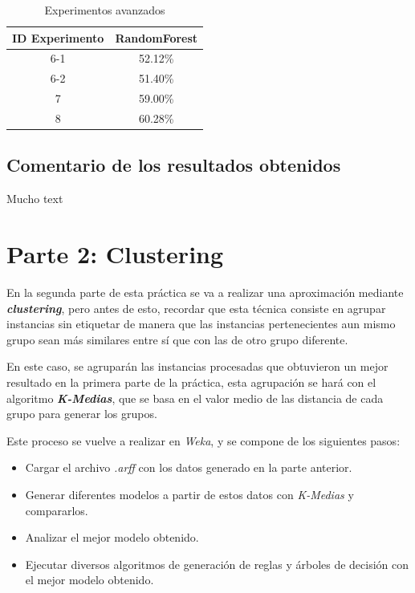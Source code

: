 \documentclass[12pt,a4paper, xcolor=table]{article}
\begin{document}
        \begin{table}[h]
            \centering
            \begin{tabular}{|c|c|}
            \hline
            \rowcolor[HTML]{DAE8FC}
            \textbf{ID Experimento} & \textbf{RandomForest} \\ \hline
            6-1                     & 52.12\%               \\ \hline
            6-2                     & 51.40\%               \\ \hline
            7                       & 59.00\%               \\ \hline
            8                       & 60.28\%               \\ \hline
            \end{tabular}
            \caption{Experimentos avanzados}
                \label{fig:graf_exp1}
        \end{table}

    \subsection{Comentario de los resultados obtenidos}
    Mucho text

\section{Parte 2: Clustering}

En la segunda parte de esta práctica se va a realizar una aproximación mediante \textbf{\textit{clustering}}, pero antes de esto, recordar que esta técnica consiste en agrupar instancias sin etiquetar de manera que las instancias pertenecientes aun mismo grupo sean más similares entre sí que con las de otro grupo diferente. 

\vspace{2mm}

En este caso, se agruparán las instancias procesadas que obtuvieron un mejor resultado en la primera parte de la práctica, esta agrupación se hará con el algoritmo \textbf{\textit{K-Medias}}, que se basa en el valor medio de las distancia de cada grupo para generar los grupos. 

\vspace{1mm}

Este proceso se vuelve a realizar en \textit{Weka}, y se compone de los siguientes pasos:

\begin{itemize}
    \item Cargar el archivo \textit{.arff} con los datos generado en la parte anterior.
    \item Generar diferentes modelos a partir de estos datos con \textit{K-Medias} y compararlos.
    \item Analizar el mejor modelo obtenido.
    \item Ejecutar diversos algoritmos de generación de reglas y árboles de decisión con el mejor modelo obtenido.
\end{itemize}
\end{document}
